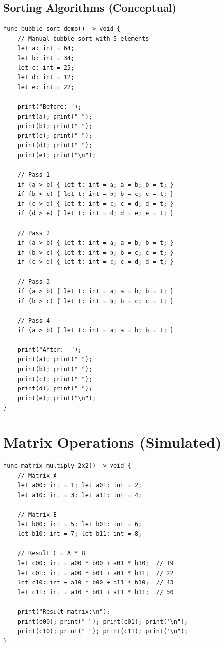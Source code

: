 \documentclass[12pt,a4paper,oneside]{book}
\begin{document}
\subsection{Sorting Algorithms (Conceptual)}

\begin{lstlisting}[style=algo, caption={Bubble Sort Concept}]
func bubble_sort_demo() -> void {
    // Manual bubble sort with 5 elements
    let a: int = 64;
    let b: int = 34;
    let c: int = 25;
    let d: int = 12;
    let e: int = 22;
    
    print("Before: ");
    print(a); print(" ");
    print(b); print(" ");
    print(c); print(" ");
    print(d); print(" ");
    print(e); print("\n");
    
    // Pass 1
    if (a > b) { let t: int = a; a = b; b = t; }
    if (b > c) { let t: int = b; b = c; c = t; }
    if (c > d) { let t: int = c; c = d; d = t; }
    if (d > e) { let t: int = d; d = e; e = t; }
    
    // Pass 2
    if (a > b) { let t: int = a; a = b; b = t; }
    if (b > c) { let t: int = b; b = c; c = t; }
    if (c > d) { let t: int = c; c = d; d = t; }
    
    // Pass 3
    if (a > b) { let t: int = a; a = b; b = t; }
    if (b > c) { let t: int = b; b = c; c = t; }
    
    // Pass 4
    if (a > b) { let t: int = a; a = b; b = t; }
    
    print("After:  ");
    print(a); print(" ");
    print(b); print(" ");
    print(c); print(" ");
    print(d); print(" ");
    print(e); print("\n");
}
\end{lstlisting}

\section{Matrix Operations (Simulated)}

\begin{lstlisting}[style=algo, caption={2x2 Matrix Multiplication}]
func matrix_multiply_2x2() -> void {
    // Matrix A
    let a00: int = 1; let a01: int = 2;
    let a10: int = 3; let a11: int = 4;
    
    // Matrix B
    let b00: int = 5; let b01: int = 6;
    let b10: int = 7; let b11: int = 8;
    
    // Result C = A * B
    let c00: int = a00 * b00 + a01 * b10;  // 19
    let c01: int = a00 * b01 + a01 * b11;  // 22
    let c10: int = a10 * b00 + a11 * b10;  // 43
    let c11: int = a10 * b01 + a11 * b11;  // 50
    
    print("Result matrix:\n");
    print(c00); print(" "); print(c01); print("\n");
    print(c10); print(" "); print(c11); print("\n");
}
\end{lstlisting}
\end{document}
